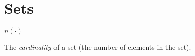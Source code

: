 
\section*{Sets}

\begin{vworkmathtermglossaryenum}

\item {}\mbox{\boldmath $n( \cdot )$}

      The \emph{cardinality} of a set (the
      number of elements in the set).

\end{vworkmathtermglossaryenum}


%
%
%
%
%
%
%
%
%
%
%
%
%
%
%
%

